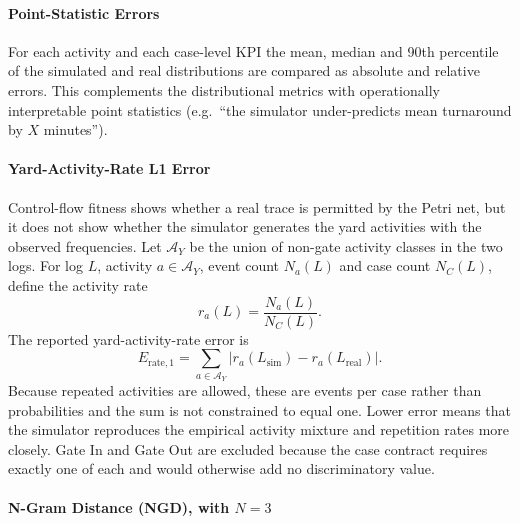 \paragraph{Point-Statistic Errors}

For each activity and each case-level KPI the mean, median and 90th
percentile of the simulated and real distributions are compared as
absolute and relative errors. This complements the distributional
metrics with operationally interpretable point statistics
(e.g.\ ``the simulator under-predicts mean turnaround by $X$ minutes'').

\paragraph{Yard-Activity-Rate L1 Error}

Control-flow fitness shows whether a real trace is permitted by the Petri net,
but it does not show whether the simulator generates the yard activities with
the observed frequencies. Let $\mathcal A_Y$ be the union of non-gate activity
classes in the two logs. For log $L$, activity $a\in\mathcal A_Y$, event
count $N_a(L)$ and case count $N_C(L)$, define the activity rate
\begin{equation}
    r_a(L)=\frac{N_a(L)}{N_C(L)}.
\end{equation}
The reported yard-activity-rate error is
\begin{equation}
    E_{\mathrm{rate},1}
    =\sum_{a\in\mathcal A_Y}
      \left|r_a(L_{\mathrm{sim}})-r_a(L_{\mathrm{real}})\right|.
\end{equation}
Because repeated activities are allowed, these are events per case rather than
probabilities and the sum is not constrained to equal one. Lower error means
that the simulator reproduces the empirical activity mixture and repetition
rates more closely. Gate In and Gate Out are excluded because the case contract
requires exactly one of each and would otherwise add no discriminatory value.

\paragraph{N-Gram Distance (NGD), with $N=3$}

